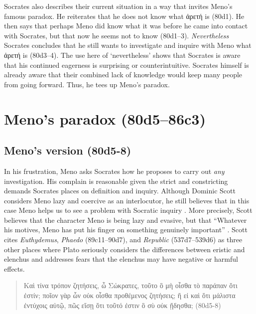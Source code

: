 \documentclass[12pt,letterpaper]{article}
\begin{document}
Socrates also describes their current situation in a way that invites Meno's famous paradox. He reiterates that he does not know what \textgreek{ἀρετή} is (80d1). He then says that perhaps Meno did know what it was before he came into contact with Socrates, but that now he seems not to know (80d1--3). \textit{Nevertheless} Socrates concludes that he still wants to investigate and inquire with Meno what \textgreek{ἀρετή} is (80d3--4). The use here of `nevertheless' shows that Socrates is aware that his continued eagerness is surprising or counterintuitive. Socrates himself is already aware that their combined lack of knowledge would keep many people from going forward. Thus, he tees up Meno's paradox.


\section{Meno's paradox (80d5--86c3)}

\subsection{Meno's version (80d5-8)}

In his frustration, Meno asks Socrates how he proposes to carry out \textit{any} investigation. His complain is reasonable given the strict and constricting demands Socrates places on definition and inquiry. Although Dominic Scott considers Meno lazy and coercive as an interlocutor, he still believes that in this case Meno helps us to see a problem with Socratic inquiry \parencite[69--74]{scott2006}. More precisely, Scott believes that the character Meno is being lazy and evasive, but that ``Whatever his motives, Meno has put his finger on something genuinely important'' \parencite[71--72]{scott2006}. Scott cites \textit{Euthydemus}, \textit{Phaedo} (89c11--90d7), and \textit{Republic} (537d7--539d6) as three other places where Plato seriously considers the differences between eristic and elenchus and addresses fears that the elenchus may have negative or harmful effects.

\begin{quote}
\begin{greek}Καὶ τίνα τρόπον ζητήσεις, ὦ Σώκρατες, τοῦτο ὃ μὴ οἶσθα τὸ παράπαν ὅτι ἐστίν; ποῖον γὰρ ὧν οὐκ οἶσθα προθέμενος ζητήσεις; ἢ εἰ καὶ ὅτι μάλιστα ἐντύχοις αὐτῷ, πῶς εἴσῃ ὅτι τοῦτό ἐστιν ὃ σὺ οὐκ ᾔδησθα; (80d5-8)\end{greek}
\end{quote}
\end{document}
